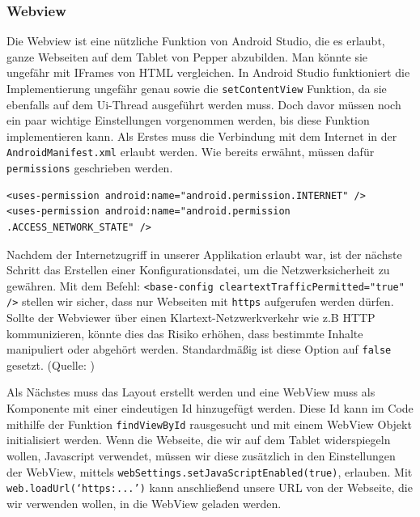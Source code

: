 \subsubsection{Webview}

Die Webview ist eine nützliche Funktion von Android Studio, die es erlaubt, ganze Webseiten auf dem Tablet von Pepper abzubilden. Man könnte sie ungefähr mit IFrames von HTML vergleichen. In Android Studio funktioniert die Implementierung ungefähr genau sowie die \verb|setContentView| Funktion, da sie ebenfalls auf dem Ui-Thread ausgeführt werden muss. Doch davor müssen noch ein paar wichtige Einstellungen vorgenommen werden, bis diese Funktion implementieren kann. 
Als Erstes muss die Verbindung mit dem Internet in der \verb|AndroidManifest.xml| erlaubt werden. Wie bereits erwähnt, müssen dafür \verb|permissions| geschrieben werden. \\
\begin{lstlisting}
<uses-permission android:name="android.permission.INTERNET" />
<uses-permission android:name="android.permission
.ACCESS_NETWORK_STATE" />
\end{lstlisting}

Nachdem der Internetzugriff in unserer Applikation erlaubt war, ist der nächste Schritt das Erstellen einer Konfigurationsdatei, um die Netzwerksicherheit zu gewähren.
Mit dem Befehl: \verb|<base-config cleartextTrafficPermitted="true" />| stellen wir sicher, dass nur Webseiten mit \verb|https| aufgerufen werden dürfen. 
Sollte der Webviewer über einen Klartext-Netzwerkverkehr wie z.B HTTP kommunizieren, könnte dies das Risiko erhöhen, dass bestimmte Inhalte manipuliert oder abgehört werden. Standardmäßig ist diese Option auf \verb|false| gesetzt. 
(Quelle: \cite{webview})

Als Nächstes muss das Layout erstellt werden und eine WebView muss als Komponente mit einer eindeutigen Id hinzugefügt werden. Diese Id kann im 
Code mithilfe der Funktion \verb|findViewById| rausgesucht und mit einem WebView Objekt initialisiert werden. Wenn die Webseite, die wir 
auf dem Tablet widerspiegeln wollen, Javascript verwendet, müssen wir diese zusätzlich in den Einstellungen der WebView, mittels 
\verb|webSettings.setJavaScriptEnabled(true)|, erlauben. Mit \verb|web.loadUrl(‘https:...’)| kann anschließend unsere URL von der 
Webseite, die wir verwenden wollen, in die WebView geladen werden. 



